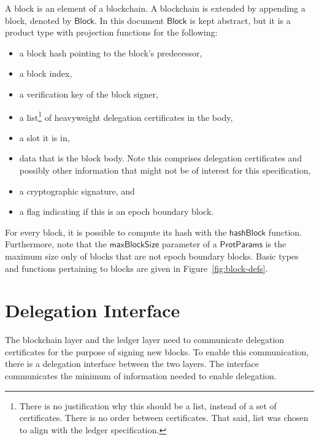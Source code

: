 \documentclass[11pt,a4paper]{article}
\newcommand{\fun}[1]{\mathsf{#1}}
\newcommand{\type}[1]{\mathsf{#1}}
\newcommand{\Block}{\type{Block}}
\newcommand{\ProtParams}{\type{ProtParams}} %
\newcommand{\hashofblockname}{hashBlock}
\newcommand{\maxblocksizename}{maxBlockSize}
\begin{document}
A block is an element of a blockchain.
%
A blockchain is extended by appending a block, denoted by $\Block$.
%
In this document $\Block$ is kept abstract, but it is a product type with
projection functions for the following:
%
\begin{itemize}
\item a block hash pointing to the block's predecessor,
\item a block index,
\item a verification key of the block signer,
\item a list\footnote{There is no justification why this should be a list,
    instead of a set of certificates. There is no order between
    certificates. That said, list was chosen to align with the ledger
    specification.} of heavyweight delegation certificates in the body,
\item a slot it is in,
\item data that is the block body. Note this comprises delegation certificates
  and possibly other information that might not be of interest for this
  specification,
\item a cryptographic signature, and
\item a flag indicating if this is an epoch boundary block.
\end{itemize}


For every block, it is possible to compute its hash with the
$\fun{\hashofblockname}$ function.
%
Furthermore, note that the $\fun{\maxblocksizename}$ parameter of a
$\ProtParams$ is the maximum size only of blocks that are not epoch boundary
blocks.
%
Basic types and functions pertaining to blocks are given in
Figure~\ref{fig:block-defs}.


\section{Delegation Interface}
\label{sec:del-interface}

The blockchain layer and the ledger layer need to communicate delegation
certificates for the purpose of signing new blocks.
%
To enable this communication, there is a delegation interface between the two
layers.
%
The interface communicates the minimum of information needed to enable
delegation.
\end{document}
